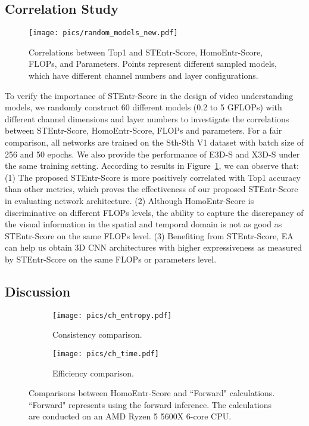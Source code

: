 \documentclass{article} \usepackage{iclr2023_conference,times}
\begin{document}
\subsection{Correlation Study}

\begin{figure}[h]
    \centering
    \texttt{[image: pics/random\_models\_new.pdf]}
    \caption{Correlations between Top1 and STEntr-Score, HomoEntr-Score, FLOPs, and Parameters. Points represent different sampled models, which have different channel numbers and layer configurations.}
    \label{fig:corre}
\end{figure}



To verify the importance of STEntr-Score in the design of video understanding models, we randomly construct 60 different models (0.2 to 5 GFLOPs) with different channel dimensions and layer numbers to investigate the correlations between STEntr-Score, HomoEntr-Score, FLOPs and parameters. For a fair comparison, all networks are trained on the Sth-Sth V1 dataset with batch size of 256 and 50 epochs.
We also provide the performance of E3D-S and X3D-S under the same training setting. According to results in Figure~\ref{fig:corre}, we can observe that:
(1) The proposed STEntr-Score is more positively correlated with Top1 accuracy than other metrics, which proves the effectiveness of our proposed STEntr-Score in evaluating network architecture.
(2) Although HomoEntr-Score is discriminative on different FLOPs levels, the ability to capture the discrepancy of the visual information in the spatial and temporal domain is not as good as STEntr-Score on the same FLOPs level.
(3) Benefiting from STEntr-Score, EA can help us obtain 3D CNN architectures with higher expressiveness as measured by STEntr-Score on the same FLOPs or parameters level.





\subsection{Discussion}
\begin{figure}[h]
	\centering
    \begin{subfigure}[b]{0.47\textwidth}
  \centering
  \texttt{[image: pics/ch\_entropy.pdf]}
\caption{Consistency comparison.}
  \label{sfig:score}
    \end{subfigure}
  \begin{subfigure}[b]{0.47\textwidth}
  \centering
  \texttt{[image: pics/ch\_time.pdf]}
\caption{Efficiency comparison.}
  \label{sfig:time}
    \end{subfigure}
	\caption{Comparisons between HomoEntr-Score and “Forward" calculations. “Forward" represents using the forward inference. The calculations are conducted on an AMD Ryzen 5 5600X 6-core CPU.}
	\label{fig:simulation}	
\end{figure}
\end{document}
